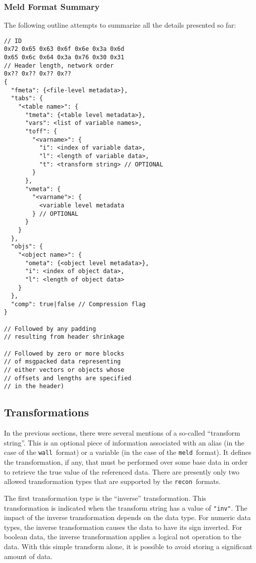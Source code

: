 \documentclass[11pt,a4paper,twocolumn]{article}
\newcommand{\recon}{\texttt{recon}}
\newcommand{\wall}{\texttt{wall}}
\newcommand{\meld}{\texttt{meld}}
\newcommand{\code}[1]{\texttt{#1}} %
\begin{document}
\subsubsection{Meld Format Summary}

The following outline attempts to summarize all the details presented so
far:

\begin{verbatim}
// ID
0x72 0x65 0x63 0x6f 0x6e 0x3a 0x6d
0x65 0x6c 0x64 0x3a 0x76 0x30 0x31
// Header length, network order
0x?? 0x?? 0x?? 0x??
{
  "fmeta": {<file-level metadata>},
  "tabs": {
    "<table name>": {
      "tmeta": {<table level metadata>},
      "vars": <list of variable names>,
      "toff": {
        "<varname>": {
          "i": <index of variable data>,
          "l": <length of variable data>,
          "t": <transform string> // OPTIONAL
        }
      },
      "vmeta": {
        "<varname">: {
          <variable level metadata
        } // OPTIONAL
      }
    }
  },
  "objs": {
    "<object name>": {
      "ometa": {<object level metadata>},
      "i": <index of object data>,
      "l": <length of object data>
    }
  },
  "comp": true|false // Compression flag
}

// Followed by any padding
// resulting from header shrinkage

// Followed by zero or more blocks
// of msgpacked data representing
// either vectors or objects whose
// offsets and lengths are specified
// in the header)
\end{verbatim}

\subsection{Transformations}
\label{sec:trans}


In the previous sections, there were several mentions of a so-called
``transform string''.  This is an optional piece of information
associated with an alias (in the case of the \wall\ format) or a
variable (in the case of the \meld\ format).  It defines the
transformation, if any, that must be performed over some base data in
order to retrieve the true value of the referenced data.  There are
presently only two allowed transformation types that are supported by
the \recon\ formats.

The first transformation type is the ``inverse'' transformation.  This
transformation is indicated when the transform string has a value of
\code{"inv"}.  The impact of the inverse transformation depends on the
data type.  For numeric data types, the inverse transformation causes
the data to have its sign inverted.  For boolean data, the inverse
transformation applies a logical not operation to the data.  With this
simple transform alone, it is possible to avoid storing a significant
amount of data.
\end{document}
